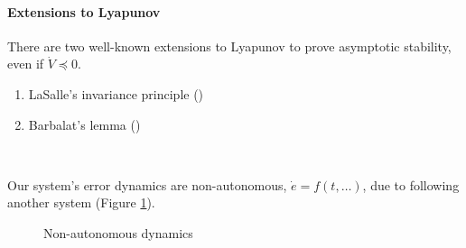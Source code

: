\paragraph{Extensions to Lyapunov}
There are two well-known extensions to Lyapunov to prove
asymptotic stability, even if $\dot{V} \preceq 0$.
\begin{enumerate}
\item LaSalle's invariance principle
    ()
\item Barbalat's lemma
    ()
\end{enumerate}~

Our system's error dynamics are non-autonomous,
$\dot{e} = f(t, \dots)$, due to
following another system (Figure \ref{fig:non-autonomous-system}).
\begin{figure}[H]
\centering
{}
\caption{Non-autonomous dynamics}
\label{fig:non-autonomous-system}
\end{figure}

